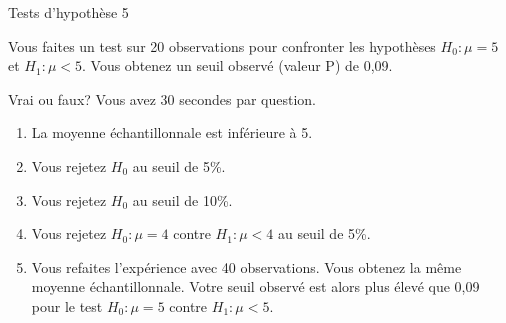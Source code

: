 \documentclass{BeamerTemplate}
\begin{document}
\begin{frame}{Tests d'hypothèse 5}\label{tests5}
\begin{center}

Vous faites un test sur 20 observations  pour confronter les hypothèses $H_0: \mu=5$ et $H_1: \mu<5$. Vous obtenez un seuil observé (valeur P) de 0,09.

\medskip
Vrai ou faux? Vous avez 30 secondes par question.
\medskip

\begin{enumerate} \itemsep 3mm
\item La moyenne échantillonnale est inférieure à 5.
\item Vous rejetez $H_0$ au seuil de 5\%.
\item Vous rejetez $H_0$ au seuil de 10\%.
\item Vous rejetez $H_0: \mu=4$ contre $H_1: \mu<4$ au seuil de 5\%.
\item Vous refaites l'expérience avec 40 observations. Vous obtenez la même moyenne échantillonnale. Votre seuil observé est alors plus élevé que 0,09 pour le test $H_0: \mu=5$ contre $H_1: \mu<5$.
\end{enumerate}


\end{center}

\end{frame}
\end{document}
